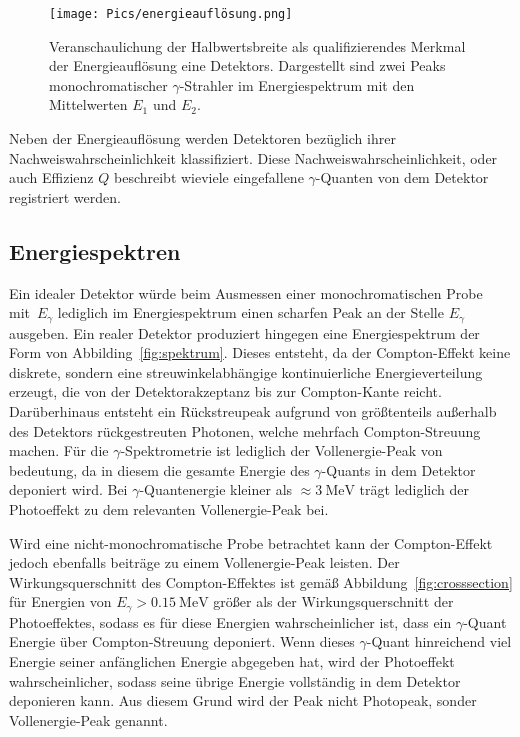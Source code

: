 \begin{figure}
  \centering
  \texttt{[image: Pics/energieauflösung.png]}
  \caption{Veranschaulichung der Halbwertsbreite als qualifizierendes Merkmal der Energieauflösung eine Detektors.
  Dargestellt sind zwei Peaks monochromatischer $\gamma$-Strahler im Energiespektrum mit den
  Mittelwerten $E_1$ und $E_2$\cite{anleitung}.}
  \label{fig:energieauflösung}
\end{figure}

Neben der Energieauflösung werden Detektoren bezüglich ihrer Nachweiswahrscheinlichkeit
klassifiziert. Diese Nachweiswahrscheinlichkeit, oder auch Effizienz $Q$
beschreibt wieviele eingefallene $\gamma$-Quanten von dem Detektor
registriert werden.

\subsection{Energiespektren}
\label{subsec:energiespektrum}

Ein idealer Detektor würde beim Ausmessen einer monochromatischen Probe mit~$E_\gamma$
lediglich im Energiespektrum einen scharfen Peak an der Stelle $E_\gamma$
ausgeben. Ein realer Detektor produziert hingegen eine Energiespektrum der
Form von Abbilding~\ref{fig:spektrum}. Dieses entsteht, da der Compton-Effekt
keine diskrete, sondern eine streuwinkelabhängige kontinuierliche Energieverteilung
erzeugt, die von der Detektorakzeptanz bis zur Compton-Kante reicht.
Darüberhinaus entsteht ein Rückstreupeak aufgrund von größtenteils
außerhalb des Detektors rückgestreuten Photonen, welche mehrfach Compton-Streuung
machen.
Für die $\gamma$-Spektrometrie ist lediglich der Vollenergie-Peak
von bedeutung, da in diesem die gesamte Energie des $\gamma$-Quants
in dem Detektor deponiert wird. Bei $\gamma$-Quantenergie kleiner
als $\approx\SI{3}{\MeV}$ trägt lediglich der Photoeffekt zu dem relevanten
Vollenergie-Peak bei.

Wird eine nicht-monochromatische Probe betrachtet kann der Compton-Effekt
jedoch ebenfalls beiträge zu einem Vollenergie-Peak leisten.
Der Wirkungsquerschnitt des Compton-Effektes ist gemäß Abbildung~\ref{fig:crosssection}
für Energien von $E_\gamma>\SI{0.15}{\MeV}$ größer als der Wirkungsquerschnitt
der Photoeffektes, sodass es für diese Energien wahrscheinlicher ist, dass ein $\gamma$-Quant
Energie über Compton-Streuung deponiert. Wenn dieses $\gamma$-Quant
hinreichend viel Energie seiner anfänglichen Energie abgegeben hat,
wird der Photoeffekt wahrscheinlicher, sodass seine übrige Energie
vollständig in dem Detektor deponieren kann.
Aus diesem Grund wird der Peak nicht Photopeak, sonder Vollenergie-Peak genannt.

